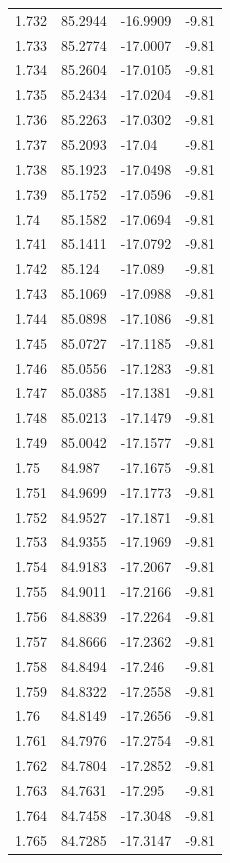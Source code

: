 \begin{tabular}{llll}
1.732 & 85.2944 & -16.9909 & -9.81 \\
1.733 & 85.2774 & -17.0007 & -9.81 \\
1.734 & 85.2604 & -17.0105 & -9.81 \\
1.735 & 85.2434 & -17.0204 & -9.81 \\
1.736 & 85.2263 & -17.0302 & -9.81 \\
1.737 & 85.2093 & -17.04 & -9.81 \\
1.738 & 85.1923 & -17.0498 & -9.81 \\
1.739 & 85.1752 & -17.0596 & -9.81 \\
1.74 & 85.1582 & -17.0694 & -9.81 \\
1.741 & 85.1411 & -17.0792 & -9.81 \\
1.742 & 85.124 & -17.089 & -9.81 \\
1.743 & 85.1069 & -17.0988 & -9.81 \\
1.744 & 85.0898 & -17.1086 & -9.81 \\
1.745 & 85.0727 & -17.1185 & -9.81 \\
1.746 & 85.0556 & -17.1283 & -9.81 \\
1.747 & 85.0385 & -17.1381 & -9.81 \\
1.748 & 85.0213 & -17.1479 & -9.81 \\
1.749 & 85.0042 & -17.1577 & -9.81 \\
1.75 & 84.987 & -17.1675 & -9.81 \\
1.751 & 84.9699 & -17.1773 & -9.81 \\
1.752 & 84.9527 & -17.1871 & -9.81 \\
1.753 & 84.9355 & -17.1969 & -9.81 \\
1.754 & 84.9183 & -17.2067 & -9.81 \\
1.755 & 84.9011 & -17.2166 & -9.81 \\
1.756 & 84.8839 & -17.2264 & -9.81 \\
1.757 & 84.8666 & -17.2362 & -9.81 \\
1.758 & 84.8494 & -17.246 & -9.81 \\
1.759 & 84.8322 & -17.2558 & -9.81 \\
1.76 & 84.8149 & -17.2656 & -9.81 \\
1.761 & 84.7976 & -17.2754 & -9.81 \\
1.762 & 84.7804 & -17.2852 & -9.81 \\
1.763 & 84.7631 & -17.295 & -9.81 \\
1.764 & 84.7458 & -17.3048 & -9.81 \\
1.765 & 84.7285 & -17.3147 & -9.81 \\

\end{tabular}
